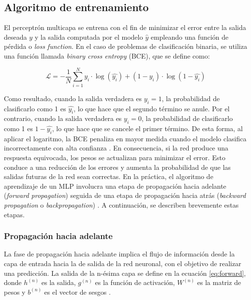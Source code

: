 \subsection{Algoritmo de entrenamiento}
El perceptrón multicapa se entrena con el fin de minimizar el error entre la salida deseada $y$ y 
la salida computada por el modelo $\hat{y}$ empleando una función de pérdida o \emph{loss function}. 
En el caso de problemas de clasificación binaria, se utiliza una función llamada 
\emph{binary cross entropy} (BCE), que se define como:

\begin{equation}
	\label{eq:BCE}
	\mathcal{L} = -\frac{1}{N} \sum_{i=1}^Ny_{i}\cdot\log(\hat{y_{i}}) + (1 - y_{i})\cdot\log(1 - \hat{y_{i}})
\end{equation}

Como resultado, cuando la salida verdadera es $y_{i} = 1$, la probabilidad de clasificarlo como 
1 es  $\hat{y_{i}}$, lo que hace que el segundo término se anule. Por el contrario, cuando la 
salida verdadera es $y_{i} = 0$, la probabilidad de clasificarlo como 1 es  $1 - \hat{y_{i}}$, 
lo que hace que se cancele el primer término. De esta forma, al aplicar el logaritmo, la BCE 
penaliza en mayor medida cuando el modelo clasifica incorrectamente con alta confianza \citep{CITE:46}. 
En consecuencia, si la red produce una respuesta equivocada, los pesos se actualizan para minimizar el error. 
Esto conduce a una reducción de los errores y aumenta la probabilidad de que las salidas futuras de la red 
sean correctas. En la práctica, el algoritmo de aprendizaje de un MLP involucra una etapa de propagación 
hacia adelante (\emph{forward propagation}) seguida de una etapa de propagación hacia atrás (\emph{backward propagation} 
o \emph{backpropagation}) \citep{CITE:35}. A continuación, se describen brevemente estas etapas.

\subsubsection{Propagación hacia adelante}
La fase de propagación hacia adelante implica el flujo de información desde la capa de entrada hacia la de 
salida de la red neuronal, con el objetivo de realizar una predicción. La salida de la n-ésima capa se 
define en la ecuación \ref{eq:forward}, donde $h^{(n)}$ es la salida, $g^{(n)}$ es la función de activación, $W^{(n)}$ 
es la matriz de pesos y $b^{(n)}$ es el vector de sesgos \citep{CITE:35} \citep{CITE:44}.

